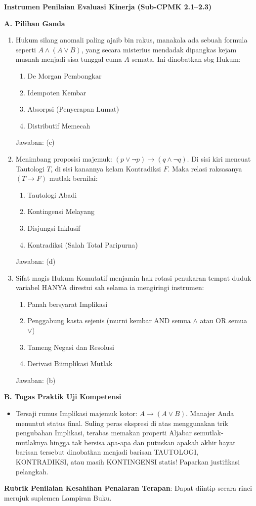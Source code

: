 \documentclass[../main]{subfiles}
\begin{document}
\begin{asesmen}
\textbf{Instrumen Penilaian Evaluasi Kinerja (Sub-CPMK 2.1--2.3)}

\textbf{A. Pilihan Ganda}
\begin{enumerate}
  \item Hukum silang anomali paling ajaib bin rakus, manakala ada sebuah formula seperti $A \land (A \lor B)$, yang secara misterius mendadak dipangkas kejam musnah menjadi sisa tunggal cuma $A$ semata. Ini dinobatkan sbg Hukum:
  \begin{enumerate}
    \item De Morgan Pembongkar
    \item Idempoten Kembar
    \item Absorpsi (Penyerapan Lumat)
    \item Distributif Memecah
  \end{enumerate}
  Jawaban: (c)

  \item Menimbang proposisi majemuk: $(p \vee \neg p) \rightarrow (q \wedge \neg q)$. Di sisi kiri mencuat Tautologi $T$, di sisi kanannya kelam Kontradiksi $F$. Maka relasi raksasanya $(T \rightarrow F)$ mutlak bernilai:
  \begin{enumerate}
    \item Tautologi Abadi
    \item Kontingensi Melayang
    \item Disjungsi Inklusif
    \item Kontradiksi (Salah Total Paripurna)
  \end{enumerate}
  Jawaban: (d)

  \item Sifat magis Hukum Komutatif menjamin hak rotasi penukaran tempat duduk variabel HANYA direstui sah selama ia mengiringi instrumen:
  \begin{enumerate}
    \item Panah bersyarat Implikasi
    \item Penggabung kasta sejenis (murni kembar AND semua $\land$ atau OR semua $\lor$)
    \item Tameng Negasi dan Resolusi
    \item Derivasi Biimplikasi Mutlak
  \end{enumerate}
  Jawaban: (b)
\end{enumerate}

\textbf{B. Tugas Praktik Uji Kompetensi}
\begin{itemize}
  \item Tersaji rumus Implikasi majemuk kotor: $A \rightarrow (A \lor B)$. Manajer Anda menuntut status final. Suling peras ekspresi di atas menggunakan trik pengubahan Implikasi, terabas memakan properti Aljabar semutlak-mutlaknya hingga tak bersisa apa-apa dan putuskan apakah akhir hayat barisan tersebut dinobatkan menjadi barisan TAUTOLOGI, KONTRADIKSI, atau masih KONTINGENSI statis! Paparkan justifikasi pelangkah. 
\end{itemize}

\textbf{Rubrik Penilaian Kesahihan Penalaran Terapan}: Dapat diintip secara rinci merujuk suplemen Lampiran Buku.
\end{asesmen}
\end{document}
